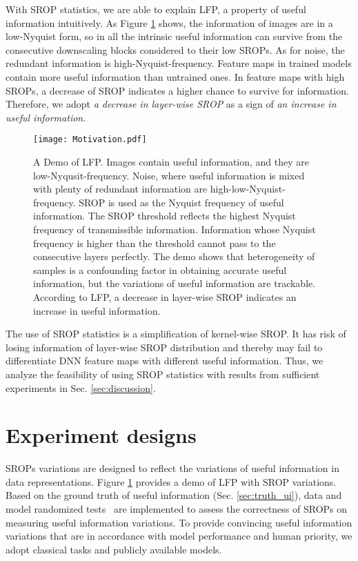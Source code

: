 \documentclass{article}
\begin{document}
With SROP statistics, we are able to explain LFP, a property of useful information intuitively. As Figure \ref{fig:motivation} shows, the information of images are in a low-Nyquist form, so in all the intrinsic useful information can survive from the consecutive downscaling blocks considered to their low SROPs. As for noise, the redundant information is high-Nyquist-frequency. Feature maps in trained models contain more useful information than untrained ones. In feature maps with high SROPs, a decrease of SROP indicates a higher chance to survive for information. Therefore, we adopt \textit{a decrease in layer-wise SROP} as a sign of \textit{an increase in useful information}.

\begin{figure}
    \begin{center}
    \texttt{[image: Motivation.pdf]}
    \end{center}
    \caption{A Demo of LFP. Images contain useful information, and they are low-Nyqusit-frequency. Noise, where useful information is mixed with plenty of redundant information are high-low-Nyquist-frequency. SROP is used as the Nyquist frequency of useful information. The SROP threshold reflects the highest Nyquist frequency of transmissible information. Information whose Nyquist frequency is higher than the threshold cannot pass to the consecutive layers perfectly. The demo shows that heterogeneity of samples is a confounding factor in obtaining accurate useful information, but the variations of useful information are trackable. According to LFP, a decrease in layer-wise SROP indicates an increase in useful information.}
    \label{fig:motivation}
\end{figure}
The use of SROP statistics is a simplification of kernel-wise SROP. It has risk of losing information of layer-wise SROP distribution and thereby may fail to differentiate DNN feature maps with different useful information. Thus, we analyze the feasibility of using SROP statistics with results from sufficient experiments in Sec. \ref{sec:discussion}.

\section{Experiment designs}
SROPs variations are designed to reflect the variations of useful information in data representations. Figure \ref{fig:motivation} provides a demo of LFP with SROP variations. Based on the ground truth of useful information (Sec. \ref{sec:truth_ui}), data and model randomized tests~\cite{Sanity_Checks_for_Saliency_Maps} are implemented to assess the correctness of SROPs on measuring useful information variations. To provide convincing useful information variations that are in accordance with model performance and human priority, we adopt classical tasks and publicly available models.
\end{document}
